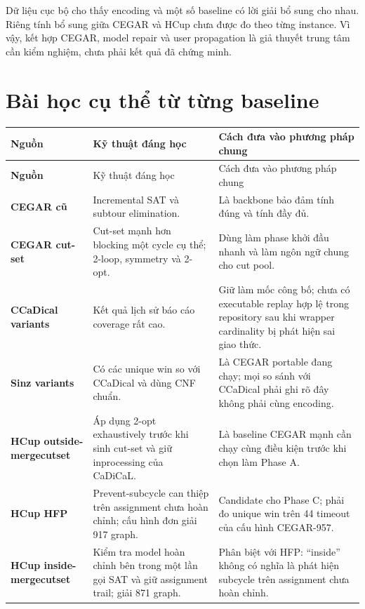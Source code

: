 \documentclass[11pt,a4paper,oneside]{scrreprt}
\begin{document}
\begin{resultbox}
Dữ liệu cục bộ cho thấy encoding và một số baseline có lời giải bổ sung cho nhau. Riêng tính bổ sung giữa CEGAR và HCup chưa được đo theo từng instance. Vì vậy, kết hợp CEGAR, model repair và user propagation là giả thuyết trung tâm cần kiểm nghiệm, chưa phải kết quả đã chứng minh.
\end{resultbox}

\section{Bài học cụ thể từ từng baseline}

\begin{longtable}{>{\raggedright\arraybackslash\bfseries\sffamily}p{28mm} >{\raggedright\arraybackslash}p{50mm} >{\raggedright\arraybackslash}p{66mm}}
\toprule
Nguồn & Kỹ thuật đáng học & Cách đưa vào phương pháp chung \\
\midrule
\endfirsthead
\toprule
Nguồn & Kỹ thuật đáng học & Cách đưa vào phương pháp chung \\
\midrule
\endhead
CEGAR cũ & Incremental SAT và subtour elimination. & Là backbone bảo đảm tính đúng và tính đầy đủ. \\
CEGAR cut-set & Cut-set mạnh hơn blocking một cycle cụ thể; 2-loop, symmetry và 2-opt. & Dùng làm phase khởi đầu nhanh và làm ngôn ngữ chung cho cut pool. \\
CCaDical variants & Kết quả lịch sử báo cáo coverage rất cao. & Giữ làm mốc công bố; chưa có executable replay hợp lệ trong repository sau khi wrapper cardinality bị phát hiện sai giao thức. \\
Sinz variants & Có các unique win so với CCaDical và dùng CNF chuẩn. & Là CEGAR portable đang chạy; mọi so sánh với CCaDical phải ghi rõ đây không phải cùng encoding. \\
HCup outside-mergecutset & Áp dụng 2-opt exhaustively trước khi sinh cut-set và giữ inprocessing của CaDiCaL. & Là baseline CEGAR mạnh cần chạy cùng điều kiện trước khi chọn làm Phase A. \\
HCup HFP & Prevent-subcycle can thiệp trên assignment chưa hoàn chỉnh; cấu hình đơn giải 917 graph. & Candidate cho Phase C; phải đo unique win trên 44 timeout của cấu hình CEGAR-957. \\
HCup inside-mergecutset & Kiểm tra model hoàn chỉnh bên trong một lần gọi SAT và giữ assignment trail; giải 871 graph. & Phân biệt với HFP: ``inside'' không có nghĩa là phát hiện subcycle trên assignment chưa hoàn chỉnh. \\

\end{longtable}
\end{document}
